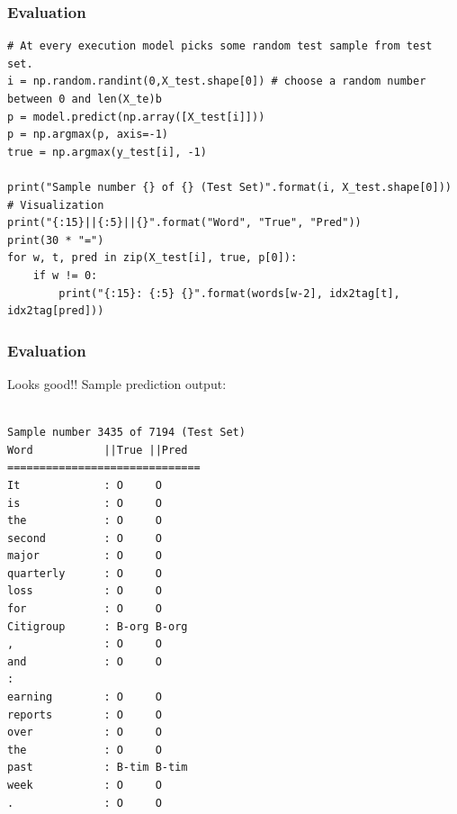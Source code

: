 \begin{frame}[fragile]\frametitle{Evaluation}

\begin{lstlisting}
# At every execution model picks some random test sample from test set.
i = np.random.randint(0,X_test.shape[0]) # choose a random number between 0 and len(X_te)b
p = model.predict(np.array([X_test[i]]))
p = np.argmax(p, axis=-1)
true = np.argmax(y_test[i], -1)

print("Sample number {} of {} (Test Set)".format(i, X_test.shape[0]))
# Visualization
print("{:15}||{:5}||{}".format("Word", "True", "Pred"))
print(30 * "=")
for w, t, pred in zip(X_test[i], true, p[0]):
    if w != 0:
        print("{:15}: {:5} {}".format(words[w-2], idx2tag[t], idx2tag[pred]))
\end{lstlisting}
\end{frame}

\begin{frame}[fragile]\frametitle{Evaluation}

Looks good!! Sample prediction output:
\begin{lstlisting}

Sample number 3435 of 7194 (Test Set)
Word           ||True ||Pred
==============================
It             : O     O
is             : O     O
the            : O     O
second         : O     O
major          : O     O
quarterly      : O     O
loss           : O     O
for            : O     O
Citigroup      : B-org B-org
,              : O     O
and            : O     O
:
earning        : O     O
reports        : O     O
over           : O     O
the            : O     O
past           : B-tim B-tim
week           : O     O
.              : O     O
\end{lstlisting}
\end{frame}


